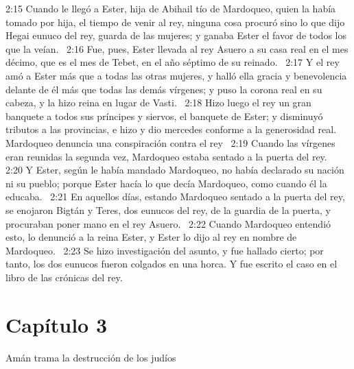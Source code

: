 2:15 Cuando le llegó a Ester, hija de Abihail tío de Mardoqueo, quien la había tomado por hija, el tiempo de venir al rey, ninguna cosa procuró sino lo que dijo Hegai eunuco del rey, guarda de las mujeres; y ganaba Ester el favor de todos los que la veían.  
2:16 Fue, pues, Ester llevada al rey Asuero a su casa real en el mes décimo, que es el mes de Tebet, en el año séptimo de su reinado.  
2:17 Y el rey amó a Ester más que a todas las otras mujeres, y halló ella gracia y benevolencia delante de él más que todas las demás vírgenes; y puso la corona real en su cabeza, y la hizo reina en lugar de Vasti.  
2:18 Hizo luego el rey un gran banquete a todos sus príncipes y siervos, el banquete de Ester; y disminuyó tributos a las provincias, e hizo y dio mercedes conforme a la generosidad real.  
Mardoqueo denuncia una conspiración contra el rey  
2:19 Cuando las vírgenes eran reunidas la segunda vez, Mardoqueo estaba sentado a la puerta del rey.  
2:20 Y Ester, según le había mandado Mardoqueo, no había declarado su nación ni su pueblo; porque Ester hacía lo que decía Mardoqueo, como cuando él la educaba.  
2:21 En aquellos días, estando Mardoqueo sentado a la puerta del rey, se enojaron Bigtán y Teres, dos eunucos del rey, de la guardia de la puerta, y procuraban poner mano en el rey Asuero.  
2:22 Cuando Mardoqueo entendió esto, lo denunció a la reina Ester, y Ester lo dijo al rey en nombre de Mardoqueo.  
2:23 Se hizo investigación del asunto, y fue hallado cierto; por tanto, los dos eunucos fueron colgados en una horca. Y fue escrito el caso en el libro de las crónicas del rey.  
\section*{Capítulo 3}
Amán trama la destrucción de los judíos  

